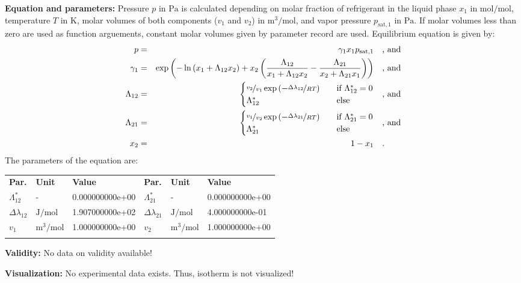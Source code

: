 \textbf{Equation and parameters:}
\newline
%
Pressure $p$ in $\si{\pascal}$ is calculated depending on molar fraction of refrigerant in the liquid phase $x_1$ in $\si{\mole\per\mole}$, temperature $T$ in $\si{\kelvin}$, molar volumes of both components ($v_1$ and $v_2$) in $\si{\cubic\meter\per\mole}$, and vapor pressure $p_\mathrm{sat,1}$ in $\si{\pascal}$. If molar volumes less than zero are used as function arguements, constant molar volumes given by parameter record are used. Equilibrium equation is given by:
%
\begin{equation*}
\begin{split}
p &=& \gamma_1 x_1 p_\mathrm{sat,1} & \quad\text{, and} \\
\gamma_1 &=& \exp \left( - \ln \left( x_1 + \Lambda_{12} x_2 \right) + x_2 \left( \frac{\Lambda_{12}}{x_1 + \Lambda_{12} x_2} - \frac{\Lambda_{21}}{x_2 + \Lambda_{21} x_1} \right) \right) & \quad\text{, and} \\
\Lambda_{12} &=& \begin{cases} \nicefrac{v_2}{v_1} \exp \left( - \nicefrac{\Delta\lambda_{12}}{R T} \right) & \quad \text{if } \Lambda_{12}^{*} = 0 \\ \Lambda_{12}^{*}  & \quad \text{else} \end{cases}  & \quad\text{, and} \\
\Lambda_{21} &=& \begin{cases} \nicefrac{v_1}{v_2} \exp \left( - \nicefrac{\Delta\lambda_{21}}{R T} \right) & \quad \text{if } \Lambda_{21}^{*} = 0 \\ \Lambda_{21}^{*}  & \quad \text{else} \end{cases}  & \quad\text{, and} \\
x_2 &=& 1 - x_1  & \quad\text{.} \\
\end{split}
\end{equation*}
%
The parameters of the equation are:
%
\begin{longtable}[l]{lll|lll}
\toprule
\addlinespace
\textbf{Par.} & \textbf{Unit} & \textbf{Value} &	\textbf{Par.} & \textbf{Unit} & \textbf{Value} \\
\addlinespace
\midrule
\endhead

\bottomrule
\endfoot
\bottomrule
\endlastfoot
\addlinespace

$\Lambda_{12}^{*}$ & - & 0.000000000e+00 & $\Lambda_{21}^{*}$ & - & 0.000000000e+00 \\
$\Delta\lambda_{12}$ & $\si{\joule\per\mole}$ & 1.907000000e+02 & $\Delta\lambda_{21}$ & $\si{\joule\per\mole}$ & 4.000000000e-01 \\
$v_1$ & $\si{\cubic\meter\per\mole}$ & 1.000000000e+00 & $v_2$ & $\si{\cubic\meter\per\mole}$ & 1.000000000e+00 \\

\addlinespace\end{longtable}

\textbf{Validity:}
\newline
No data on validity available!
\newline

\textbf{Visualization:}
%
\newline
No experimental data exists. Thus, isotherm is not visualized!
%

\FloatBarrier
\newpage
